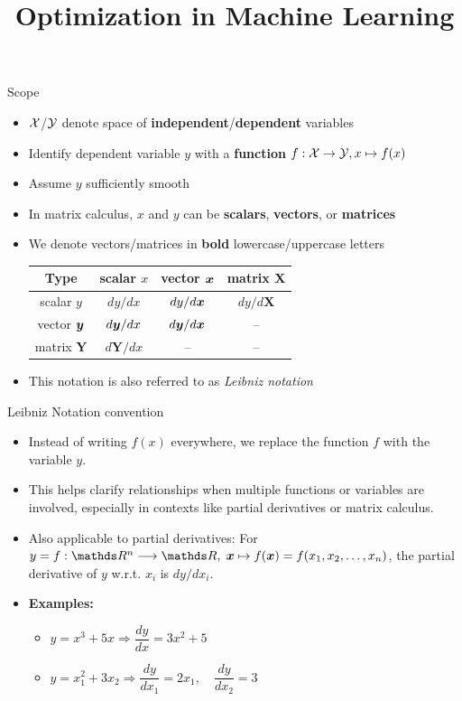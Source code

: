 \documentclass[11pt,compress,t,notes=noshow, xcolor=table]{beamer}
\title{Optimization in Machine Learning}
\begin{document}

\begin{framev}{Scope}
\begin{itemize}
\setlength{\itemsep}{0.5\baselineskip}
\item $\mathcal{X}$/$\mathcal{Y}$ denote space of \textbf{independent}/\textbf{dependent} variables
\item Identify dependent variable $y$ with a \textbf{function} $f: \mathcal{X} \to \mathcal{Y}, x\mapsto f(x)$
\item Assume $y$ sufficiently smooth
\item In matrix calculus, $x$ and $y$ can be \textbf{scalars}, \textbf{vectors}, or \textbf{matrices}
\item We denote vectors/matrices in \textbf{bold} lowercase/uppercase letters
\spacer
\begin{table}
\centering
\begin{tabular}{c||c|c|c}
Type & scalar $x$ & vector $\bm{x}$ & matrix $\mathbf{X}$ \\ \hline\hline
scalar $y$ & $d y / d x$ & $d y / d\bm{x}$ & $d y / d\mathbf{X}$ \\ \hline
vector $\bm{y}$ & $d\bm{y} / d x$ & $d\bm{y} / d\bm{x}$ & -- \\ \hline
matrix $\mathbf{Y}$ & $d\mathbf{Y} / d x$ & -- & --
\end{tabular}
\end{table}
\item This notation is also referred to as \emph{Leibniz notation}
\end{itemize}
\end{framev}


\begin{framev}{Leibniz Notation convention}
\begin{itemize} \setlength{\itemsep}{0.5\baselineskip}
\item Instead of writing $f(x)$ everywhere, we replace the function $f$ with the variable $y$.
\item This helps clarify relationships when multiple functions or variables are involved, especially in contexts like partial derivatives or matrix calculus.
\item Also applicable to partial derivatives: For $y = f:\R^n\longrightarrow\R,\; \xv\mapsto\fx=f(x_1, x_2, \ldots, x_n)$, the partial derivative of $y$ w.r.t. $x_i$ is $d y/d x_i$.
\item \textbf{Examples:}
\begin{itemize}
\item    $
y = x^3 + 5x \Longrightarrow
\dfrac{dy}{dx} = 3x^2 + 5
$
\spacer
\item $y = x_1^2 + 3x_2 \Longrightarrow
\dfrac{d y}{d x_1} = 2x_1, \quad
\dfrac{d y}{d x_2} = 3$
\end{itemize}
\end{itemize}
\end{framev}
\end{document}

